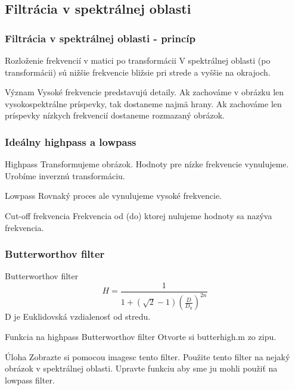\documentclass{beamer}
\begin{document}
\subsection{Filtrácia v spektrálnej oblasti}

\begin{frame}
\frametitle{Filtrácia v spektrálnej oblasti - princíp}
  \begin{block}{Rozloženie frekvencií v matici po transformácii}
    V spektrálnej oblasti (po transformácii) sú nižšie frekvencie bližsie pri strede a vyššie na okrajoch.
  \end{block}
  
  \begin{block}{Význam}
    Vysoké frekvencie predstavujú detaily. Ak zachováme v obrázku len vysokospektrálne príspevky, tak dostaneme najmä hrany. Ak zachováme len príspevky nízkych frekvencií dostaneme rozmazaný obrázok.
  \end{block}
\end{frame}

\begin{frame}
\frametitle{Ideálny highpass a lowpass}
  \begin{block}{Highpass}
    Transformujeme obrázok. Hodnoty pre nízke frekvencie vynulujeme. Urobíme inverznú transformáciu.
  \end{block}
  
  \begin{block}{Lowpass}
    Rovnaký proces ale vynulujeme vysoké frekvencie.
  \end{block}
  
  \begin{block}{Cut-off frekvencia}
    Frekvencia od (do) ktorej nulujeme hodnoty sa nazýva frekvencia.
  \end{block}
\end{frame}

\begin{frame}[fragile]
\frametitle{Butterworthov filter}
  \begin{block}{Butterworthov filter}
  \begin{equation*}
    H = \frac{1}{1+\left(\sqrt{2} - 1\right) \left(\frac{D}{D_0}\right)^{2n}}
  \end{equation*}
  D je Euklidovská vzdialenosť od stredu.
  \end{block}

  \begin{block}{Funkcia na highpass Butterworthov filter}
    Otvorte si butterhigh.m zo zipu.
  \end{block}
  
  \begin{block}{Úloha}
    Zobrazte si pomocou imagesc tento filter. Použite tento filter na nejaký obrázok v spektrálnej oblasti. Upravte funkciu aby sme ju mohli použiť na lowpass filter.
  \end{block}    
\end{frame}
\end{document}
